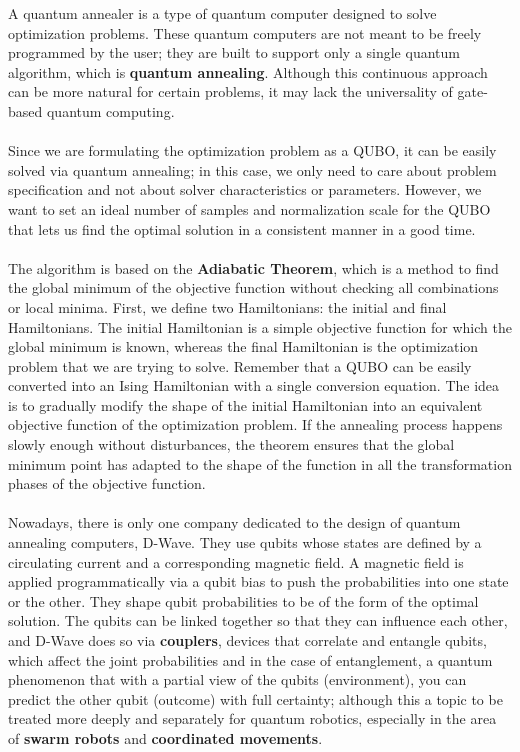 \documentclass[11pt]{article}
\begin{document}
A quantum annealer is a type of quantum computer designed to solve optimization problems. These quantum computers are not meant to be freely programmed by the user; they are built to support only a single quantum algorithm, which is \textbf{quantum annealing}. Although this continuous approach can be more natural for certain problems, it may lack the universality of gate-based quantum computing. \\
\\
Since we are formulating the optimization problem as a QUBO, it can be easily solved via quantum annealing; in this case, we only need to care about problem specification and not about solver characteristics or parameters. However, we want to set an ideal number of samples and normalization scale for the QUBO that lets us find the optimal solution in a consistent manner in a good time.\\
\\
The algorithm is based on the \textbf{Adiabatic Theorem}, which is a method to find the global minimum of the objective function without checking all combinations or local minima. First, we define two Hamiltonians: the initial and final Hamiltonians. The initial Hamiltonian is a simple objective function for which the global minimum is known, whereas the final Hamiltonian is the optimization problem that we are trying to solve. Remember that a QUBO can be easily converted into an Ising Hamiltonian with a single conversion equation. The idea is to gradually modify the shape of the initial Hamiltonian into an equivalent objective function of the optimization problem. If the annealing process happens slowly enough without disturbances, the theorem ensures that the global minimum point has adapted to the shape of the function in all the transformation phases of the objective function. \cite{Kadowaki_1998}\\
\\
Nowadays, there is only one company dedicated to the design of quantum annealing computers, D-Wave\cite{DwaveQA}. They use qubits whose states are defined by a circulating current and a corresponding magnetic field. A magnetic field is applied programmatically via a qubit bias to push the probabilities into one state or the other. They shape qubit probabilities to be of the form of the optimal solution. The qubits can be linked together so that they can influence each other, and D-Wave does so via \textbf{couplers}, devices that correlate and entangle qubits, which affect the joint probabilities and in the case of entanglement, a quantum phenomenon that with a partial view of the qubits (environment), you can predict the other qubit (outcome) with full certainty; although this a topic to be treated more deeply and separately for quantum robotics, especially in the area of \textbf{swarm robots} and \textbf{coordinated movements}.\\
\end{document}
